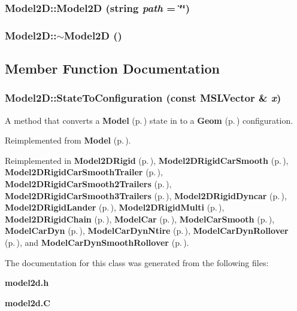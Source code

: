 \subsubsection{\setlength{\rightskip}{0pt plus 5cm}Model2D::Model2D (string {\em path} = \char`\"{}\char`\"{})}\label{classModel2D_a0}


\subsubsection{\setlength{\rightskip}{0pt plus 5cm}Model2D::$\sim$Model2D ()\hspace{0.3cm}{\tt  [inline, virtual]}}\label{classModel2D_a1}




\subsection{Member Function Documentation}
\subsubsection{ Model2D::State\-To\-Configuration (const {\bf MSLVector} \& {\em x})\hspace{0.3cm}{\tt  [virtual]}}\label{classModel2D_a2}


A method that converts a {\bf Model} {\rm (p.\,\pageref{classModel})} state in to a {\bf Geom} {\rm (p.\,\pageref{classGeom})} configuration.



Reimplemented from {\bf Model} {\rm (p.\,\pageref{classModel_a8})}.

Reimplemented in {\bf Model2DRigid} {\rm (p.\,\pageref{classModel2DRigid_a6})}, {\bf Model2DRigid\-Car\-Smooth} {\rm (p.\,\pageref{classModel2DRigidCarSmooth_a5})}, {\bf Model2DRigid\-Car\-Smooth\-Trailer} {\rm (p.\,\pageref{classModel2DRigidCarSmoothTrailer_a4})}, {\bf Model2DRigid\-Car\-Smooth2Trailers} {\rm (p.\,\pageref{classModel2DRigidCarSmooth2Trailers_a4})}, {\bf Model2DRigid\-Car\-Smooth3Trailers} {\rm (p.\,\pageref{classModel2DRigidCarSmooth3Trailers_a4})}, {\bf Model2DRigid\-Dyncar} {\rm (p.\,\pageref{classModel2DRigidDyncar_a3})}, {\bf Model2DRigid\-Lander} {\rm (p.\,\pageref{classModel2DRigidLander_a3})}, {\bf Model2DRigid\-Multi} {\rm (p.\,\pageref{classModel2DRigidMulti_a3})}, {\bf Model2DRigid\-Chain} {\rm (p.\,\pageref{classModel2DRigidChain_a2})}, {\bf Model\-Car} {\rm (p.\,\pageref{classModelCar_a2})}, {\bf Model\-Car\-Smooth} {\rm (p.\,\pageref{classModelCarSmooth_a2})}, {\bf Model\-Car\-Dyn} {\rm (p.\,\pageref{classModelCarDyn_a2})}, {\bf Model\-Car\-Dyn\-Ntire} {\rm (p.\,\pageref{classModelCarDynNtire_a2})}, {\bf Model\-Car\-Dyn\-Rollover} {\rm (p.\,\pageref{classModelCarDynRollover_a4})}, and {\bf Model\-Car\-Dyn\-Smooth\-Rollover} {\rm (p.\,\pageref{classModelCarDynSmoothRollover_a3})}.

The documentation for this class was generated from the following files:\begin{CompactItemize}
\item 
{\bf model2d.h}\item 
{\bf model2d.C}\end{CompactItemize}
